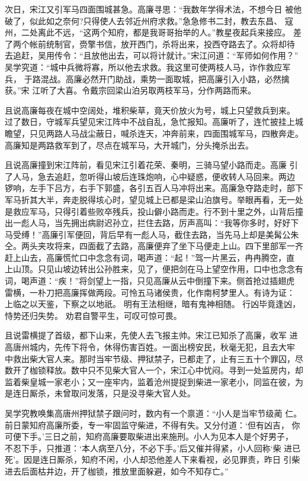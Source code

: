 次日，宋江又引军马四面围城甚急。高廉寻思：“我数年学得术法，不想今日
被他破了，似此如之奈何?只得使人去邻近州府求救。”急急修书二封，教去东昌、
寇州，二处离此不远，“这两个知府，都是我哥哥抬举的人。”教星夜起兵来接应。
差了两个帐前统制官，赍擎书信，放开西门，杀将出来，投西夺路去了。众将却待
去追赶，吴用传令：“且放他出去，可以将计就计。”宋江问道：“军师如何作用？”
吴学究道：“城中兵微将寡，所以他去求救。我这里可使两枝人马，诈作救应军兵，
于路混战。高廉必然开门助战，乘势一面取城，把高廉引入小路，必然擒获。”宋
江听了大喜。令戴宗回梁山泊另取两枝军马，分作两路而来。

且说高廉每夜在城中空阔处，堆积柴草，竟天价放火为号，城上只望救兵到来。
过了数日，守城军兵望见宋江阵中不战自乱，急忙报知。高廉听了，连忙披挂上城
瞻望，只见两路人马战尘蔽日，喊杀连天，冲奔前来，四面围城军马，四散奔走。
高廉知是两路救军到了，尽点在城军马，大开城门，分头掩杀出去。

且说高廉撞到宋江阵前，看见宋江引着花荣、秦明，三骑马望小路而走。高廉
引了人马，急去追赶，忽听得山坡后连珠炮响，心中疑惑，便收转人马回来。两边
锣响，左手下吕方，右手下郭盛，各引五百人马冲将出来。高廉急夺路走时，部下
军马折其大半，奔走脱得垓心时，望见城上已都是梁山泊旗号。举眼再看，无一处
是救应军马，只得引着些败卒残兵，投山僻小路而走。行不到十里之外，山背后撞
出一彪人马，当先拥出病尉迟孙立，拦住去路，厉声高叫：“我等你多时，好好下
马受缚！”高廉引军便回，背后早有一彪人马，截住去路，当先马上却是美髯公朱
仝。两头夹攻将来，四面截了去路，高廉便弃了坐下马便走上山。四下里部军一齐
赶上山去，高廉慌忙口中念念有词，喝声道：“起！”驾一片黑云，冉冉腾空，直
上山顶。只见山坡边转出公孙胜来，见了，便把剑在马上望空作用，口中也念念有
词，喝声道：“疾！”将剑望上一指，只见高廉从云中倒撞下来。侧首抢过插翅虎
雷横，一朴刀把高廉挥做两段。可怜五马诸侯贵，化作南柯梦里人。有诗为证：
上临之以天鉴，下察之以地祇。
明有王法相继，暗有鬼神相随。
行凶毕竟逢凶，恃势还归失势。
劝君自警平生，可叹可惊可畏。

且说雷横提了首级，都下山来，先使人去飞报主帅。宋江已知杀了高廉，收军
进高唐州城内，先传下将令，休得伤害百姓。一面出榜安民，秋毫无犯，且去大牢
中救出柴大官人来。那时当牢节级、押狱禁子，已都走了，止有三五十个罪囚，尽
数开了枷锁释放。数中只不见柴大官人一个，宋江心中忧闷。寻到一处监房内，却
监着柴皇城一家老小；又一座牢内，监着沧州提捉到柴进一家老小，同监在彼，为
是连日厮杀，未曾取问发落，只是没寻柴大官人处。

吴学究教唤集高唐州押狱禁子跟问时，数内有一个禀道：“小人是当牢节级蔺
仁。前日蒙知府高廉所委，专一牢固监守柴进，不得有失。又分付道：‘但有凶吉，
你可便下手。’三日之前，知府高廉要取柴进出来施刑。小人为见本人是个好男子，
不忍下手，只推道：‘本人病至八分，不必下手。’后又催并得紧，小人回称‘柴
进已死’。因是连日厮杀，知府不闲，小人却恐他差人下来看视，必见罪责，昨日
引柴进去后面枯井边，开了枷锁，推放里面躲避，如今不知存亡。”

